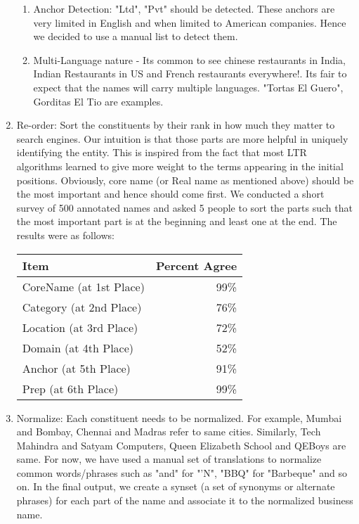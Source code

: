 \documentclass{acm_proc_article-sp}
\begin{document}
\begin{enumerate}
\begin{enumerate}
\item Anchor Detection: "Ltd", "Pvt" should be detected. These anchors are very limited in English and when limited to American companies. Hence we decided to use a manual list to detect them.
\item Multi-Language nature - Its common to see chinese restaurants in India, Indian Restaurants in US and French restaurants everywhere!. Its fair to expect that the names will carry multiple languages. "Tortas El Guero", Gorditas El Tio are examples. 
\end{enumerate}
\item Re-order: Sort the constituents by their rank in how much they matter to search engines. Our intuition is that those parts are more helpful in uniquely identifying the entity. This is inspired from the fact that most LTR algorithms learned to give more weight to the terms appearing in the initial positions. Obviously, core name (or Real name as mentioned above) should be the most important and hence should come first. We conducted a short survey of 500 annotated names and asked 5 people to sort the parts such that the most important part is at the beginning and least one at the end. The results were as follows:
\begin{center}
  \begin{tabular}{ | l | r |}
    \hline
    Item & Percent Agree \\ \hline 
    CoreName (at 1st Place) & 99\%  \\ \hline    
    Category (at 2nd Place) & 76\% \\ \hline
    Location (at 3rd Place) & 72\% \\ \hline 
    Domain (at 4th Place) & 52\% \\ \hline 
    Anchor (at 5th Place) & 91\% \\ \hline 
    Prep (at 6th Place) & 99\% \\ \hline
  \end{tabular}
\end{center}
\item Normalize: Each constituent needs to be normalized. For example, Mumbai and Bombay, Chennai and Madras refer to same cities. Similarly, Tech Mahindra and Satyam Computers, Queen Elizabeth School and QEBoys are same. For now, we have used a manual set of translations to normalize common words/phrases such as "and" for "'N", "BBQ" for "Barbeque" and so on. In the final output, we create a synset (a set of synonyms or alternate phrases) for each part of the name and associate it to the normalized business name.
\end{enumerate}
 
\end{document}
